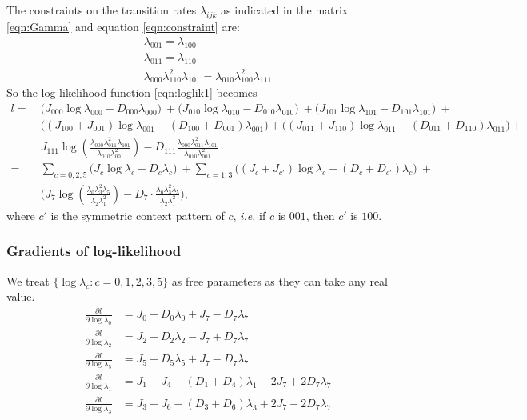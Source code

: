 \documentclass[11pt]{article}
\begin{document}
The constraints on the transition rates $\lambda_{ijk}$ as indicated in
the matrix \eqref{eqn:Gamma} and equation \eqref{eqn:constraint} are:
\begin{equation}\label{eqn:constraints}
  \begin{array}{c}
    \lambda_{001} = \lambda_{100}\\
    \lambda_{011} = \lambda_{110}\\
    \lambda_{000}\lambda_{110}^2\lambda_{101} = \lambda_{010}\lambda_{100}^2\lambda_{111}
  \end{array}
\end{equation}
So the log-likelihood function \eqref{eqn:loglik1} becomes
\begin{equation}\label{eqn:loglik2}
  \begin{aligned}
    l = ~ & \bigg(J_{000}\log\lambda_{000} - D_{000}\lambda_{000}\bigg) ~ +
    \bigg(J_{010}\log\lambda_{010} - D_{010}\lambda_{010}\bigg) ~ +
    \bigg(J_{101}\log\lambda_{101} - D_{101}\lambda_{101}\bigg) ~ + \\
    & \bigg( (J_{100} + J_{001})\log\lambda_{001} - (D_{100}+D_{001})\lambda_{001}\bigg) +
    \bigg((J_{011} + J_{110})\log\lambda_{011} - (D_{011}+D_{110})\lambda_{011}\bigg) +  \\
    & J_{111}\log\left(\frac{\lambda_{000}\lambda_{011}^2\lambda_{101}}{\lambda_{010}\lambda_{001}^2}\right) - D_{111}\frac{\lambda_{000}\lambda_{011}^2\lambda_{101}}{\lambda_{010}\lambda_{001}^2} \\
    = ~ & \sum\limits_{c=0,2,5}\bigg(J_c\log\lambda_c - D_c\lambda_c\bigg) ~ +
    \sum\limits_{c=1,3} \bigg((J_c + J_{c'})\log\lambda_c - (D_c + D_{c'})\lambda_c\bigg) ~ + \\
    ~ & \bigg(J_7\log(\frac{\lambda_0\lambda_3^2\lambda_5}{\lambda_2\lambda_1^2})
    - D_7\cdot\frac{\lambda_0\lambda_3^2\lambda_5}{\lambda_2\lambda_1^2} \bigg),
  \end{aligned}
\end{equation}
where $c'$ is the symmetric context pattern of $c$, \textit{i.e.} if
$c$ is $001$, then $c'$ is $100$.

\subsubsection{Gradients of log-likelihood}
We treat $\{\log\lambda_c: c = 0,1,2,3,5\}$ as free parameters as they can take any real value.
\begin{equation}
\begin{aligned}
\frac{\partial l}{\partial \log\lambda_0} &= J_0 - D_0\lambda_0 + J_7 - D_7\lambda_7\\
\frac{\partial l}{\partial \log\lambda_2} &= J_2 - D_2\lambda_2 - J_7 + D_7\lambda_7 \\
\frac{\partial l}{\partial \log\lambda_5} &= J_5 - D_5\lambda_5 + J_7 - D_7\lambda_7\\
\frac{\partial l}{\partial \log\lambda_1} &= J_1 + J_4 - (D_1 + D_4)\lambda_1 - 2J_7 + 2D_7\lambda_7\\
\frac{\partial l}{\partial \log\lambda_3} &= J_3 + J_6 - (D_3 + D_6)\lambda_3 + 2J_7 - 2D_7\lambda_7
\end{aligned}
\end{equation}
\end{document}
